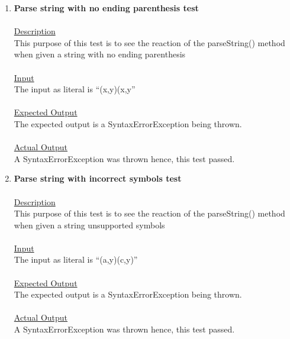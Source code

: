 \documentclass{article}
\newcommand{\quotes}[1]{``#1''}
\begin{document}
\begin{enumerate}
		\item \textbf{Parse string with no ending parenthesis test}\\\\
		\underline{Description}\\
		\indent This purpose of this test is to see the reaction of the parseString() method when given a string with no ending parenthesis\\\\
		\underline{Input}\\
		\indent The input as literal is \quotes{(x,y)(x,y}\\	\\
		\underline{Expected Output}\\
		\indent The expected output is a SyntaxErrorException being thrown.\\\\
		\underline{Actual Output}\\
		\indent A SyntaxErrorException was thrown hence, this test passed.\\
		
				
		\item \textbf{Parse string with incorrect symbols test}\\\\
		\underline{Description}\\
		\indent This purpose of this test is to see the reaction of the parseString() method when given a string unsupported symbols\\\\
		\underline{Input}\\
		\indent The input as literal is \quotes{(a,y)(c,y)}\\	\\
		\underline{Expected Output}\\
		\indent The expected output is a SyntaxErrorException being thrown.\\\\
		\underline{Actual Output}\\
		\indent A SyntaxErrorException was thrown hence, this test passed.\\
		

\end{enumerate}
\end{document}
